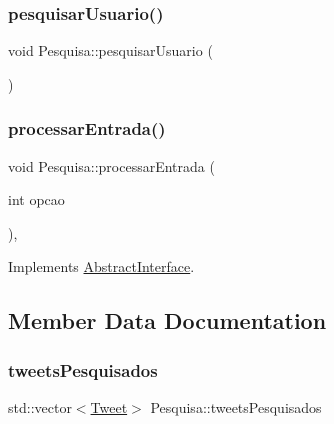 \mbox{\label{class_pesquisa_a1ba3394f5574ef910c069f9fb9595822}} 
\subsubsection{\texorpdfstring{pesquisar\+Usuario()}{pesquisarUsuario()}}
{\footnotesize\ttfamily void Pesquisa\+::pesquisar\+Usuario (\begin{DoxyParamCaption}{ }\end{DoxyParamCaption})\hspace{0.3cm}{\ttfamily [private]}}

\mbox{\label{class_pesquisa_a15652da6caa4d4f41c86dc966168a789}} 
\subsubsection{\texorpdfstring{processar\+Entrada()}{processarEntrada()}}
{\footnotesize\ttfamily void Pesquisa\+::processar\+Entrada (\begin{DoxyParamCaption}\item[{int}]{opcao }\end{DoxyParamCaption})\hspace{0.3cm}{\ttfamily [override]}, {\ttfamily [virtual]}}



Implements \hyperlink{class_abstract_interface_acf8223a1da27c6986158836a57fa51ee}{Abstract\+Interface}.



\subsection{Member Data Documentation}
\mbox{\label{class_pesquisa_a96f7efb3800aa029e233bea96b323b76}} 
\subsubsection{\texorpdfstring{tweets\+Pesquisados}{tweetsPesquisados}}
{\footnotesize\ttfamily std\+::vector$<$\hyperlink{class_tweet}{Tweet}$>$ Pesquisa\+::tweets\+Pesquisados\hspace{0.3cm}{\ttfamily [private]}}

